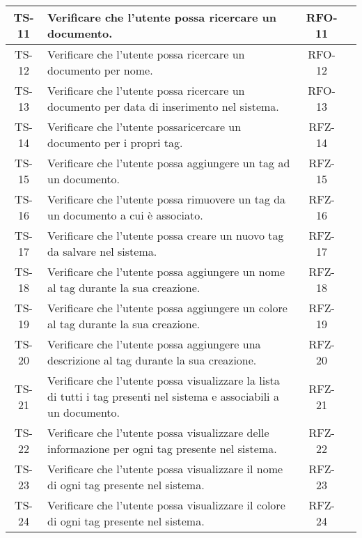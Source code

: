 \begin{xltabular}{\textwidth}{| c | X | c | c |}
    \hline
    TS-11 & Verificare che l’utente possa ricercare un documento. & RFO-11 & \textcolor{xmarkcolor}{} \\
    \hline
    TS-12 & Verificare che l’utente possa ricercare un documento per nome. & RFO-12 & \textcolor{xmarkcolor}{} \\
    \hline
    TS-13 & Verificare che l’utente possa ricercare un documento per data di inserimento nel sistema. & RFO-13 & \textcolor{xmarkcolor}{} \\
    \hline
    TS-14 & Verificare che l’utente possaricercare un documento per i propri tag. & RFZ-14 & \textcolor{xmarkcolor}{} \\
    \hline
    TS-15 & Verificare che l’utente possa aggiungere un tag ad un documento. & RFZ-15 & \textcolor{xmarkcolor}{} \\
    \hline
    TS-16 & Verificare che l’utente possa rimuovere un tag da un documento a cui è associato. & RFZ-16 & \textcolor{xmarkcolor}{} \\
    \hline
    TS-17 & Verificare che l’utente possa creare un nuovo tag da salvare nel sistema. & RFZ-17 & \textcolor{xmarkcolor}{} \\
    \hline
    TS-18 & Verificare che l’utente possa aggiungere un nome al tag durante la sua creazione. & RFZ-18 & \textcolor{xmarkcolor}{} \\
    \hline
    TS-19 & Verificare che l’utente possa aggiungere un colore al tag durante la sua creazione. & RFZ-19 & \textcolor{xmarkcolor}{} \\
    \hline
    TS-20 & Verificare che l’utente possa aggiungere una descrizione al tag durante la sua creazione. & RFZ-20 & \textcolor{xmarkcolor}{} \\
    \hline
    TS-21 &  Verificare che l’utente possa visualizzare la lista di tutti i tag presenti nel sistema e associabili a un documento. & RFZ-21 & \textcolor{xmarkcolor}{} \\
    \hline
    TS-22 & Verificare che l'utente possa visualizzare delle informazione per ogni tag presente nel sistema. & RFZ-22 & \textcolor{xmarkcolor}{} \\
    \hline
    TS-23 & Verificare che l'utente possa visualizzare il nome di ogni tag presente nel sistema. & RFZ-23 & \textcolor{xmarkcolor}{} \\
    \hline
    TS-24 & Verificare che l’utente possa visualizzare il colore di ogni tag presente nel sistema. & RFZ-24 & \textcolor{xmarkcolor}{} \\

\end{xltabular}
